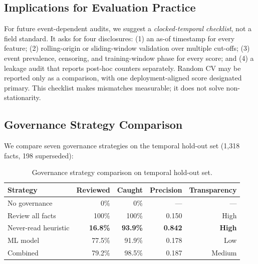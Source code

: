 \documentclass[sigconf,nonacm]{acmart}
\begin{document}
\subsection{Implications for Evaluation Practice}
For future event-dependent audits, we suggest a \emph{clocked-temporal checklist}, not a field standard. It asks for four disclosures: (1) an as-of timestamp for every feature; (2) rolling-origin or sliding-window validation over multiple cut-offs; (3) event prevalence, censoring, and training-window phase for every score; and (4) a leakage audit that reports post-hoc counters separately. Random CV may be reported only as a comparison, with one deployment-aligned score designated primary. This checklist makes mismatches measurable; it does not solve non-stationarity.



\subsection{Governance Strategy Comparison}
\label{sec:governance}

We compare seven governance strategies on the temporal hold-out set (1,318 facts, 198 superseded):

\begin{table}[h]
\centering
\caption{Governance strategy comparison on temporal hold-out set.}
\label{tab:governance}
\begin{tabular}{lrrrr}
\toprule
Strategy & Reviewed & Caught & Precision & Transparency \\
\midrule
No governance & 0\% & 0\% & --- & --- \\
Review all facts & 100\% & 100\% & 0.150 & High \\
Never-read heuristic & \textbf{16.8\%} & \textbf{93.9\%} & \textbf{0.842} & \textbf{High} \\
ML model & 77.5\% & 91.9\% & 0.178 & Low \\
Combined & 79.2\% & 98.5\% & 0.187 & Medium \\
\bottomrule
\end{tabular}
\end{table}
\end{document}
